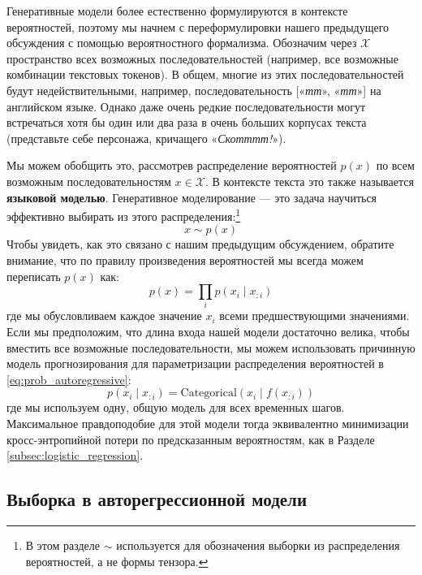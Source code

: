 Генеративные модели более естественно формулируются в контексте вероятностей, поэтому мы начнем с переформулировки нашего предыдущего обсуждения с помощью вероятностного формализма. Обозначим через $\mathcal{X}$ пространство всех возможных последовательностей (например, все возможные комбинации текстовых токенов). В общем, многие из этих последовательностей будут недействительными, например, последовательность [«\textit{тт}», «\textit{тт}»] на английском языке. Однако даже очень редкие последовательности могут встречаться хотя бы один или два раза в очень больших корпусах текста (представьте себе персонажа, кричащего «\textit{Скотттт!}»). 

Мы можем обобщить это, рассмотрев распределение вероятностей $p(x)$ по всем возможным последовательностям $x \in \mathcal{X}$. В контексте текста это также называется \textbf{языковой моделью}. Генеративное моделирование — это задача научиться эффективно выбирать из этого распределения:\footnote{В этом разделе $\sim$ используется для обозначения выборки из распределения вероятностей, а не формы тензора.}
%
$$
x \sim p(x)
$$
%
Чтобы увидеть, как это связано с нашим предыдущим обсуждением, обратите внимание, что по правилу произведения вероятностей мы всегда можем переписать $p(x)$ как:
%
\begin{equation}
p(x)=\prod_ip(x_i \mid x_{:i})
\label{eq:prob_autoregressive}
\end{equation}
%
где мы обусловливаем каждое значение $x_i$ всеми предшествующими значениями. Если мы предположим, что длина входа нашей модели достаточно велика, чтобы вместить все возможные последовательности, мы можем использовать причинную модель прогнозирования для параметризации распределения вероятностей в \eqref{eq:prob_autoregressive}:
%
$$
p(x_i \mid x_{:i})=\text{Categorical}(x_i\mid f(x_{:i}))
$$
%
где мы используем одну, общую модель для всех временных шагов. Максимальное правдоподобие для этой модели тогда эквивалентно минимизации кросс-энтропийной потери по предсказанным вероятностям, как в Разделе \ref{subsec:logistic_regression}.

\subsection{Выборка в авторегрессионной модели}

